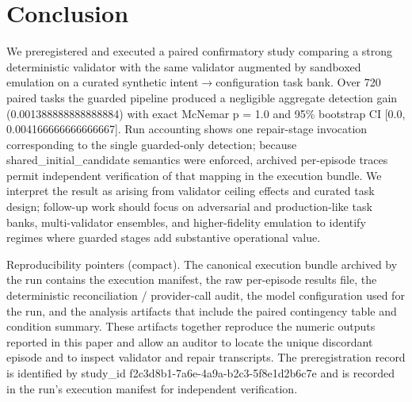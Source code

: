 \documentclass[conference]{IEEEtran}
\begin{document}
\section{Conclusion}
We preregistered and executed a paired confirmatory study comparing a strong deterministic validator with the same validator augmented by sandboxed emulation on a curated synthetic intent\ensuremath{\rightarrow}configuration task bank. Over 720 paired tasks the guarded pipeline produced a negligible aggregate detection gain (0.001388888888888884) with exact McNemar p = 1.0 and 95\% bootstrap CI [0.0, 0.004166666666666667]. Run accounting shows one repair-stage invocation corresponding to the single guarded-only detection; because shared\_initial\_candidate semantics were enforced, archived per-episode traces permit independent verification of that mapping in the execution bundle. We interpret the result as arising from validator ceiling effects and curated task design; follow-up work should focus on adversarial and production-like task banks, multi-validator ensembles, and higher-fidelity emulation to identify regimes where guarded stages add substantive operational value.

Reproducibility pointers (compact). The canonical execution bundle archived by the run contains the execution manifest, the raw per-episode results file, the deterministic reconciliation / provider-call audit, the model configuration used for the run, and the analysis artifacts that include the paired contingency table and condition summary. These artifacts together reproduce the numeric outputs reported in this paper and allow an auditor to locate the unique discordant episode and to inspect validator and repair transcripts. The preregistration record is identified by study\_id f2c3d8b1-7a6e-4a9a-b2c3-5f8e1d2b6c7e and is recorded in the run's execution manifest for independent verification.
\end{document}
